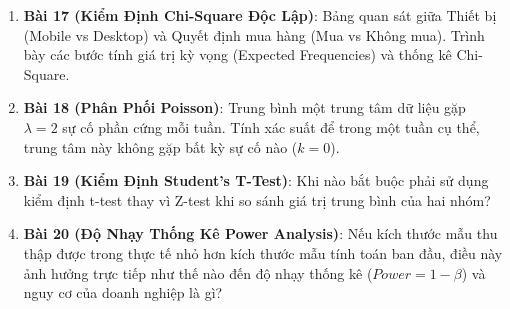 \begin{baitapbox}
\begin{enumerate}
    \item \textbf{Bài 17 (Kiểm Định Chi-Square Độc Lập)}: Bảng quan sát giữa Thiết bị (Mobile vs Desktop) và Quyết định mua hàng (Mua vs Không mua). Trình bày các bước tính giá trị kỳ vọng (Expected Frequencies) và thống kê Chi-Square.
    \item \textbf{Bài 18 (Phân Phối Poisson)}: Trung bình một trung tâm dữ liệu gặp $\lambda = 2$ sự cố phần cứng mỗi tuần. Tính xác suất để trong một tuần cụ thể, trung tâm này không gặp bất kỳ sự cố nào ($k = 0$).
    \item \textbf{Bài 19 (Kiểm Định Student's T-Test)}: Khi nào bắt buộc phải sử dụng kiểm định t-test thay vì Z-test khi so sánh giá trị trung bình của hai nhóm?
    \item \textbf{Bài 20 (Độ Nhạy Thống Kê Power Analysis)}: Nếu kích thước mẫu thu thập được trong thực tế nhỏ hơn kích thước mẫu tính toán ban đầu, điều này ảnh hưởng trực tiếp như thế nào đến độ nhạy thống kê ($Power = 1 - \beta$) và nguy cơ của doanh nghiệp là gì?
\end{enumerate}
\end{baitapbox}

